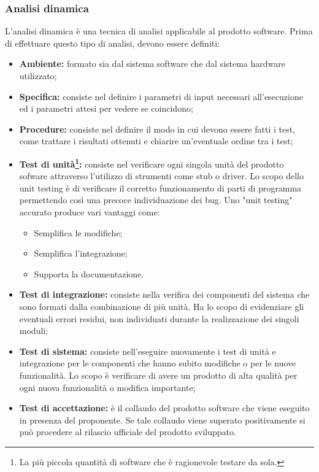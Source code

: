 	\subsubsection{Analisi dinamica}
	L'analisi dinamica è una tecnica di analisi applicabile al prodotto software. 
	Prima di effettuare questo tipo di analisi, devono essere definiti:
	\begin{itemize}
		\item \textbf{Ambiente:} formato sia dal sistema software che dal sistema hardware utilizzato;
		\item \textbf{Specifica:} consiste nel definire i parametri di input necessari all'esecuzione ed i parametri attesi per vedere se coincidono;
		\item \textbf{Procedure:} consiste nel definire il modo in cui devono essere fatti i test, come trattare i risultati ottenuti e chiarire un'eventuale ordine tra i test;
		\item \textbf{Test di unità\footnote{La più piccola quantità di software che è ragionevole testare da sola.}:} consiste nel verificare ogni singola unità del prodotto sofware attraverso l'utilizzo di strumenti come stub o driver. Lo scopo dello unit testing è di verificare il corretto funzionamento di parti di programma permettendo così una precoce individuazione dei bug. Uno "unit testing" accurato produce vari vantaggi come:
			\begin{itemize}
				\item Semplifica le modifiche;
				\item Semplifica l'integrazione;
				\item Supporta la documentazione.
			\end{itemize}
		\item \textbf{Test di integrazione:} consiste nella verifica dei componenti del sistema che sono formati dalla combinazione di più unità. Ha lo scopo di evidenziare gli eventuali errori residui, non individuati durante la realizzazione dei singoli moduli;
		\item \textbf{Test di sistema:} consiste nell'eseguire nuovamente i test di unità e integrazione per le componenti che hanno subito modifiche o per le nuove funzionalità. Lo scopo è verificare di avere un prodotto di alta qualità per ogni nuova funzionalità o modifica importante;
		\item \textbf{Test di accettazione:} è il collaudo del prodotto software che viene eseguito in presenza del proponente. Se tale collaudo viene superato positivamente si può procedere al rilascio ufficiale del prodotto sviluppato.
	\end{itemize}
	
